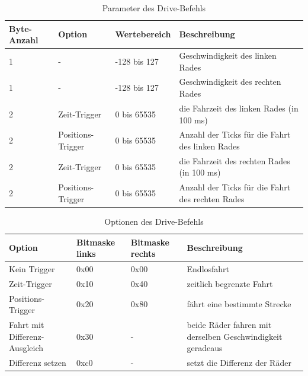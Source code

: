 \begin{table}[h]
\begin{center}
	\begin{tabularx}{\linewidth}{|l|l|l|X|}
		\hline
		\textbf{Byte-Anzahl} & \textbf{Option} & \textbf{Wertebereich} & \textbf{Beschreibung} \\
		\hline
		\hline
		1					 & - & -128 bis 127 & Geschwindigkeit des linken Rades \\
		\hline
		1					 & - & -128 bis 127 & Geschwindigkeit des rechten Rades\\
		\hline
		2					 & Zeit-Trigger & 0 bis 65535 &  die Fahrzeit des linken Rades (in 100 ms)\\
		\hline
		2					 & Positions-Trigger & 0 bis 65535 &  Anzahl der Ticks für die Fahrt des linken Rades\\
		\hline
		2					 & Zeit-Trigger & 0 bis 65535 &  die Fahrzeit des rechten Rades (in 100 ms)\\
		\hline
		2					 & Positions-Trigger & 0 bis 65535 &  Anzahl der Ticks für die Fahrt des rechten Rades\\
		\hline
	\end{tabularx}
	\caption{\label{protocol_para_drive} Parameter des Drive-Befehls}
\end{center}
\end{table}
\begin{table}[h]
\begin{center}
	\begin{tabularx}{\linewidth}{|p{2cm}|l|l|X|}
		\hline
		\textbf{Option} & \textbf{Bitmaske links} & \textbf{Bitmaske rechts} & \textbf{Beschreibung} \\
		\hline \hline
		Kein Trigger	& 0x00						   & 0x00						   & Endlosfahrt \\ \hline
		Zeit-Trigger	& 0x10						   & 0x40						   & zeitlich begrenzte Fahrt\\ \hline
		Positions-Trigger & 0x20					   & 0x80						   & fährt eine bestimmte Strecke \\ \hline
		Fahrt mit Differenz-Ausgleich & 0x30		   & -						   & beide Räder fahren mit derselben Geschwindigkeit geradeaus \\ \hline
		Differenz setzen & 0xc0					   	   & -						   & setzt die Differenz der Räder \\ \hline
	\end{tabularx}
	\caption{\label{protocol_opt_drive} Optionen des Drive-Befehls}
\end{center}
\end{table}
